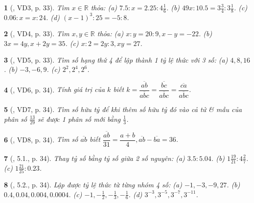\documentclass{article}
\newtheorem{baitoan}{}
\begin{document}
\begin{baitoan}[\cite{Binh_boi_duong_Toan_7_tap_1}, VD3, p. 33]
	Tìm $x\in\mathbb{R}$ thỏa: (a) $7.5:x = 2.25:4\frac{1}{6}$. (b) $49x:10.5 = 3\frac{3}{4}:3\frac{1}{8}$. (c) $0.06:x = x:24$. (d) $(x - 1)^3:25 = -5:8$.
\end{baitoan}

\begin{baitoan}[\cite{Binh_boi_duong_Toan_7_tap_1}, VD4, p. 33]
	Tìm $x,y\in\mathbb{R}$ thỏa: (a) $x:y = 20:9,x - y = -22$. (b) $3x = 4y,x + 2y = 35$. (c) $x:2 = 2y:3,xy = 27$.
\end{baitoan}

\begin{baitoan}[\cite{Binh_boi_duong_Toan_7_tap_1}, VD5, p. 33]
	Tìm số hạng thứ 4 để lập thành 1 tỷ lệ thức với 3 số: (a) $4,8,16$. (b) $-3,-6,9$. (c) $2^2,2^4,2^6$.
\end{baitoan}

\begin{baitoan}[\cite{Binh_boi_duong_Toan_7_tap_1}, VD6, p. 34]
	Tính giá trị của $k$ biết $k = \dfrac{\overline{ab}}{\overline{abc}} = \dfrac{\overline{bc}}{\overline{abc}} = \dfrac{\overline{ca}}{\overline{abc}}$.
\end{baitoan}

\begin{baitoan}[\cite{Binh_boi_duong_Toan_7_tap_1}, VD7, p. 34]
	Tìm số hữu tỷ để khi thêm số hữu tỷ đó vào cả tử \& mẫu của phân số $\frac{13}{29}$ sẽ được 1 phân số mới bằng $\frac{1}{3}$.
\end{baitoan}

\begin{baitoan}[\cite{Binh_boi_duong_Toan_7_tap_1}, VD8, p. 34]
	Tìm số $\overline{ab}$ biết $\dfrac{\overline{ab}}{31} = \dfrac{a + b}{4},\overline{ab} - \overline{ba} = 36$.
\end{baitoan}

\begin{baitoan}[\cite{Binh_boi_duong_Toan_7_tap_1}, 5.1., p. 34]
	Thay tỷ số bằng tỷ số giữa 2 số nguyên: (a) $3.5:5.04$. (b) $1\frac{19}{21}:4\frac{2}{7}$. (c) $1\frac{21}{25}:0.23$.
\end{baitoan}

\begin{baitoan}[\cite{Binh_boi_duong_Toan_7_tap_1}, 5.2., p. 34]
	Lập được tỷ lệ thức từ từng nhóm 4 số: (a) $-1,-3,-9,27$. (b) $0.4,0.04,0.004,0.0004$. (c) $-1,-\frac{1}{2},-\frac{1}{3},-\frac{1}{6}$. (d) $3^{-3},3^{-5},3^{-7},3^{-11}$.
\end{baitoan}
\end{document}
